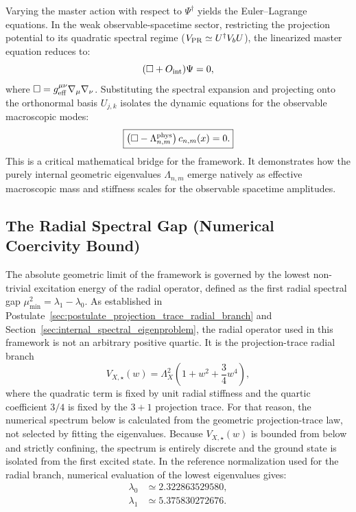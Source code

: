 \documentclass[11pt]{article}
\begin{document}
Varying the master action with respect to $\Psi^\dagger$ yields the Euler–Lagrange \cite{lagrange1788mecanique} equations. In the weak observable-spacetime sector, restricting the projection potential to its quadratic spectral regime ($V_{\rm PR} \simeq U^\dagger V_b U$), the linearized master equation \cite{Gordon1926, Klein1926} reduces to:
\begin{equation}
(\Box + O_{\rm int})\Psi = 0,
\end{equation}
where $\Box = g_{\rm eff}^{\mu\nu} \nabla_\mu \nabla_\nu$. Substituting the spectral expansion and projecting onto the orthonormal basis $U_{j,k}$ isolates the dynamic equations for the observable macroscopic modes:
\begin{equation}
\boxed{\left(
\Box
-
\Lambda_{n,m}^{\rm phys}
\right)c_{n,m}(x)=0.
}
\end{equation}
This is a critical mathematical bridge for the framework. It demonstrates how the purely internal geometric eigenvalues $\Lambda_{n,m}$ emerge natively as effective macroscopic mass and stiffness scales for the observable spacetime amplitudes. 

\subsection{The Radial Spectral Gap (Numerical Coercivity Bound)}
\label{sec:radial_spectral_gap}

The absolute geometric limit of the framework is governed by the lowest non-trivial excitation energy of the radial operator, defined as the first radial spectral gap $\mu_{\min}^2=\lambda_1-\lambda_0.$ As established in Postulate~\ref{sec:postulate_projection_trace_radial_branch} and Section~\ref{sec:internal_spectral_eigenproblem}, the radial operator used in this framework is not an arbitrary positive quartic. It is the projection-trace radial branch
\begin{equation}
V_{X,\star}(w)
=
\Lambda_X^2
\left(
1+w^2+\frac{3}{4}w^4
\right),
\end{equation}
where the quadratic term is fixed by unit radial stiffness and the quartic coefficient \(3/4\) is fixed by the \(3+1\) projection trace. For that reason, the numerical spectrum below is calculated from the geometric projection-trace law, not selected by fitting the eigenvalues. Because \(V_{X,\star}(w)\) is bounded from below and strictly confining, the spectrum is entirely discrete and the ground state is isolated from the first excited state. In the reference normalization used for the radial branch, numerical evaluation \cite{Trefethen2000, Harris2020} of the lowest eigenvalues gives:
\begin{align}
\lambda_0
&\simeq
2.322863529580,
\\
\lambda_1
&\simeq
5.375830272676.
\end{align}
\end{document}
